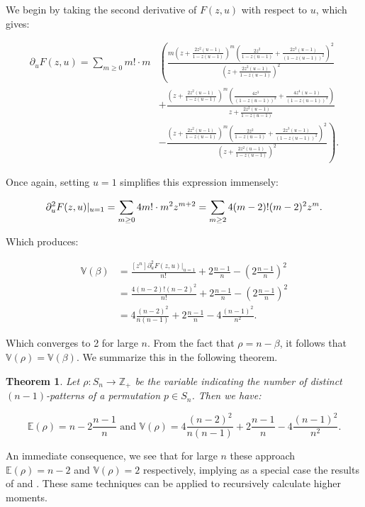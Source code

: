 \documentclass[11pt]{article}
\theoremstyle{plain}
\newtheorem{thm}{Theorem}
\theoremstyle{definition}
\newcommand{\Z}{\mathbb{Z}_+}
\newcommand{\Em}{\mathbb{E}(\rho)}
\newcommand{\Vx}{\mathbb{V}(\beta)}
\newcommand{\Vm}{\mathbb{V}(\rho)}
\def\ds{\displaystyle}
\begin{document}
  We begin by taking the second derivative of $F(z,u)$ with respect to $u$, which
  gives:

  $$\begin{aligned} 
  \partial_u F(z,u) = \ds \sum_{m\geq 0}m! \cdot m & 
  \left( \frac{m \left(z+ \frac{2z^2(u-1)}{1-z(u-1)} \right)^m
  \left(\frac{2z^2}{1-z(u-1)} + \frac{2z^3(u-1)}{(1-z(u-1))^2} \right)^2}{
  \left(z+ \frac{2z^2(u-1)}{1-z(u-1)} \right)^2} \right. \\ 
    &  + \left.
    \frac{\left(z+ \frac{2z^2(u-1)}{1-z(u-1)}\right)^m
  \left(\frac{4z^3}{(1-z(u-1))^2} + \frac{4z^4 (u-1)}{(1-z(u-1))^3} \right)}{
  z+\frac{2z^2(u-1)}{1-z(u-1)}} \right. \\ 
  & - \left.
  \frac{\left(z+\frac{2z^2(u-1)}{1-z(u-1)} \right)^m \left(\frac{2z^2}{1-z(u-1)} +
  \frac{2z^3(u-1)}{(1-z(u-1))^2} \right)^2}{ \left(z+\frac{2z^2(u-1)}{1-z(u-1)}
  \right)^2} \right) . 
   \end{aligned} $$

  Once again, setting $u=1$ simplifies this expression immensely:

  $$ \partial_u ^2 F(z,u) |_{u=1} = \ds \sum_{m\geq 0} 4m! \cdot m^2 z^{m+2} \\
  = \sum_{m \geq 2} 4(m-2)!(m-2)^2z^m. $$

  Which produces:

  $$\begin{aligned} \Vx &= \frac{[z^n] \partial_u ^2 F(z,u) |_{u=1}}{n!} +
  2\frac{n-1}{n} - \left( 2 \frac{n-1}{n} \right) ^2\\ 
  &= \frac{4(n-2)!(n-2)^2}{n!} + 2\frac{n-1}{n} - \left( 2 \frac{n-1}{n} \right)^2 \\
  &= 4\frac{(n-2)^2}{n(n-1)}+  2\frac{n-1}{n} -  4 \frac{(n-1)^2}{n^2}.
  \end{aligned}$$

  Which converges to 2 for large $n$. From the fact that $\rho = n- \beta$, it
  follows that $\Vm = \Vx$. We summarize this in the following theorem.

  \begin{thm} 
  Let $\rho: S_n \rightarrow \Z$ be the variable indicating the number of
  distinct $(n-1)$-patterns of a permutation $p \in S_n$. Then we have: 

  $$\Em = n - 2\frac{n-1}{n} \text{ and }
  \Vm = 4\frac{(n-2)^2}{n(n-1)}+  2\frac{n-1}{n} -  4 \frac{(n-1)^2}{n^2}.$$ 

  \end{thm}

  An immediate consequence, we see that for large $n$ these approach $\Em = n-2$
  and $\Vm = 2$ respectively, implying as a special case the results of \cite{kap}
  and \cite{wolf}. These same techniques can be applied to recursively calculate
  higher moments. 
\end{document}

